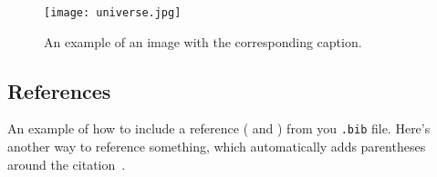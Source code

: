 \documentclass{article}
\begin{document}
\begin{figure}[h]
\centering
\texttt{[image: universe.jpg]}
\caption{An example of an image with the corresponding caption.}
\label{fig:universe-pic} %
\small
\end{figure}


\subsection{References} 
An example of how to include a reference (\cite{OpenCV} and \cite{SIFT}) from you \texttt{.bib} file. Here's another way to reference something, which automatically adds parentheses around the citation~\citep{adams1995hitchhiker}.






\nocite{*} 





\end{document}
